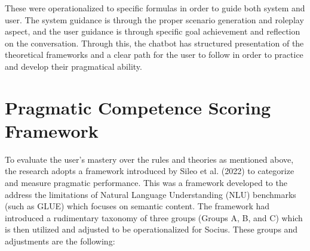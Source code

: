 These were operationalized to specific formulas in order to guide both system and user. The system guidance is through the proper scenario generation and roleplay aspect, and the user guidance is through specific goal achievement and reflection on the conversation. 
Through this, the chatbot has structured presentation of the theoretical frameworks and a clear path for the user to follow in order to practice and develop their pragmatical ability.

\section{Pragmatic Competence Scoring Framework}
To evaluate the user's mastery over the rules and theories as mentioned above, the research adopts a framework introduced by Sileo et al. (2022) to categorize and measure pragmatic performance. This was a framework developed to the address the limitations of Natural Language Understanding (NLU) benchmarks (such as GLUE)
which focuses on semantic content. The framework had introduced a rudimentary taxonomy of three groups (Groups A, B, and C) which is then utilized and adjusted to be operationalized for Socius. These groups and adjustments are the following:

